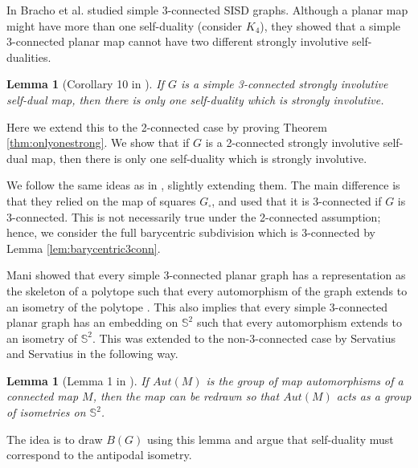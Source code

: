 \documentclass{article}
\newtheorem{lemma}[theorem]{Lemma}
\newcommand{\Sb}[0]{\mathbb{S}}
\begin{document}
In \cite{bracho2020strongly} Bracho et al. studied simple 3-connected SISD graphs. Although a planar map might have more than one self-duality (consider $K_4$), they showed that a simple 3-connected planar map cannot have two different strongly involutive self-dualities. 


\begin{lemma}[Corollary 10 in \cite{bracho2020strongly}]\label{lem:dualityunique}
    If $G$ is a simple 3-connected strongly involutive self-dual map, then there is only one self-duality which is strongly involutive.
\end{lemma}

Here we extend this to the 2-connected case by proving Theorem \ref{thm:onlyonestrong}. We show that if $G$ is a 2-connected strongly involutive self-dual map, then there is only one self-duality which is strongly involutive.     

 We follow the same ideas as in \cite{bracho2020strongly}, slightly extending them. The main difference is that they relied on the map of squares $G_\square$, and used that it is 3-connected if $G$ is 3-connected. This is not necessarily true under the 2-connected assumption; hence,  we consider the full barycentric subdivision which is 3-connected by Lemma \ref{lem:barycentric3conn}. 
 
 Mani showed that every simple 3-connected planar graph has a representation as the skeleton of a polytope such that every automorphism of the graph extends to an isometry of the polytope \cite{Mani1971}. This also implies that every simple 3-connected planar graph has an embedding on $\Sb^2$ such that every automorphism extends to an isometry of $\Sb^2$. This was extended to the non-3-connected case by Servatius and Servatius in the following way.

\begin{lemma}[Lemma 1 in \cite{ServatiusServatius1995}]\label{lem:straight}
If $Aut(M)$ is the group of map automorphisms
of a connected map $M$, then the map can be redrawn so that $Aut(M)$ acts as a group of isometries on $\Sb^2$.
\end{lemma}

The idea is to draw $B(G)$ using this lemma and argue that self-duality must correspond to the antipodal isometry. 
\end{document}
